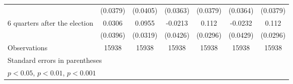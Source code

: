 \begin{table}[htbp]
\begin{tabular}{l*{6}{c}}
                    &    (0.0379)         &    (0.0405)         &    (0.0363)         &    (0.0379)         &    (0.0364)         &    (0.0379)         \\
[1em]
 6 quarters after the election&      0.0306         &      0.0955\sym{**} &     -0.0213         &       0.112\sym{***}&     -0.0232         &       0.112\sym{***}\\
                    &    (0.0396)         &    (0.0319)         &    (0.0426)         &    (0.0296)         &    (0.0429)         &    (0.0296)         \\
\hline
Observations        &       15938         &       15938         &       15938         &       15938         &       15938         &       15938         \\
\hline\hline
\multicolumn{7}{l}{\footnotesize Standard errors in parentheses}\\
\multicolumn{7}{l}{\footnotesize \sym{*} \(p<0.05\), \sym{**} \(p<0.01\), \sym{***} \(p<0.001\)}\\
\end{tabular}
\end{table}
